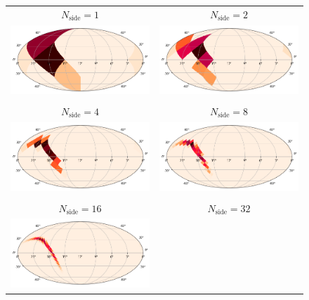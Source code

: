 \begin{colsection}
\begin{figure}[p]
    \begin{center}
        \begin{tabular}{cc}
            $N_\text{side} = 1$ &
            $N_\text{side} = 2$ \\
            \includegraphics[width=0.45\linewidth]{images/regrade/1.png} &
            \includegraphics[width=0.45\linewidth]{images/regrade/2.png} \\
            \\
            $N_\text{side} = 4$ &
            $N_\text{side} = 8$ \\
            \includegraphics[width=0.45\linewidth]{images/regrade/4.png} &
            \includegraphics[width=0.45\linewidth]{images/regrade/8.png} \\
            \\
            $N_\text{side} = 16$ &
            $N_\text{side} = 32$ \\
            \includegraphics[width=0.45\linewidth]{images/regrade/16.png} &

\end{tabular}
\end{center}
\end{figure}
\end{colsection}
